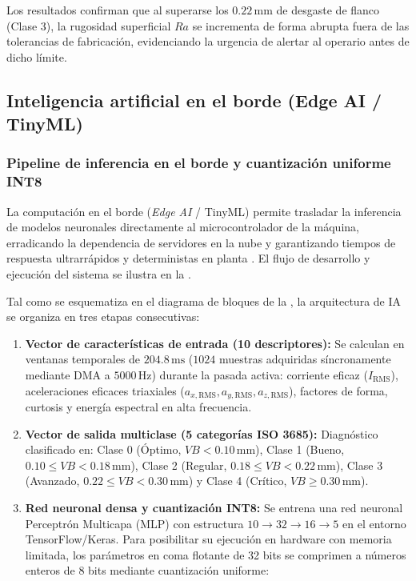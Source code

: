 Los resultados confirman que al superarse los $0.22\,\text{mm}$ de desgaste de flanco (Clase 3), la rugosidad superficial $Ra$ se incrementa de forma abrupta fuera de las tolerancias de fabricación, evidenciando la urgencia de alertar al operario antes de dicho límite.


\subsection{Inteligencia artificial en el borde (Edge AI / TinyML)}
\subsubsection{Pipeline de inferencia en el borde y cuantización uniforme INT8}

La computación en el borde (\textit{Edge AI} / TinyML) permite trasladar la inferencia de modelos neuronales directamente al microcontrolador de la máquina, erradicando la dependencia de servidores en la nube y garantizando tiempos de respuesta ultrarrápidos y deterministas en planta \citep{warden2019, hamasha2025}. El flujo de desarrollo y ejecución del sistema se ilustra en la .


Tal como se esquematiza en el diagrama de bloques de la , la arquitectura de IA se organiza en tres etapas consecutivas:
\begin{enumerate}
    \item \textbf{Vector de características de entrada (10 descriptores):} Se calculan en ventanas temporales de $204.8\,\text{ms}$ ($1024$ muestras adquiridas síncronamente mediante DMA a $5000\,\text{Hz}$) durante la pasada activa: corriente eficaz ($I_{\text{RMS}}$), aceleraciones eficaces triaxiales ($a_{x,\text{RMS}}, a_{y,\text{RMS}}, a_{z,\text{RMS}}$), factores de forma, curtosis y energía espectral en alta frecuencia.
    \item \textbf{Vector de salida multiclase (5 categorías ISO 3685):} Diagnóstico clasificado en: Clase 0 (Óptimo, $VB < 0.10\,\text{mm}$), Clase 1 (Bueno, $0.10 \le VB < 0.18\,\text{mm}$), Clase 2 (Regular, $0.18 \le VB < 0.22\,\text{mm}$), Clase 3 (Avanzado, $0.22 \le VB < 0.30\,\text{mm}$) y Clase 4 (Crítico, $VB \ge 0.30\,\text{mm}$).
    \item \textbf{Red neuronal densa y cuantización INT8:} Se entrena una red neuronal Perceptrón Multicapa (MLP) con estructura $10 \to 32 \to 16 \to 5$ en el entorno TensorFlow/Keras. Para posibilitar su ejecución en hardware con memoria limitada, los parámetros en coma flotante de 32 bits se comprimen a números enteros de 8 bits mediante cuantización uniforme:
\end{enumerate}

